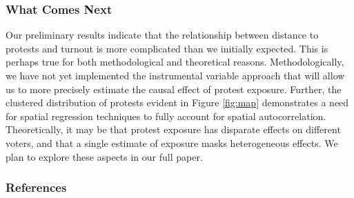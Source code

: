 \documentclass[
  12pt,
]{article}
\begin{document}
\hypertarget{what-comes-next}{%
\subsubsection*{What Comes Next}\label{what-comes-next}}

Our preliminary results indicate that the relationship between distance to protests and turnout is more complicated than we initially expected. This is perhaps true for both methodological and theoretical reasons. Methodologically, we have not yet implemented the instrumental variable approach that will allow us to more precisely estimate the causal effect of protest exposure. Further, the clustered distribution of protests evident in Figure \ref{fig:map} demonstrates a need for spatial regression techniques to fully account for spatial autocorrelation. Theoretically, it may be that protest exposure has disparate effects on different voters, and that a single estimate of exposure masks heterogeneous effects. We plan to explore these aspects in our full paper.

\newpage

\hypertarget{references}{%
\subsubsection*{References}\label{references}}
\end{document}
